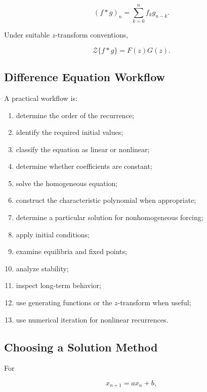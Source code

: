 \[
\boxed{
(f*g)_n
=
\sum_{k=0}^{n}
f_k g_{n-k}.
}
\]

Under suitable \(z\)-transform conventions,

\[
\boxed{
\mathcal{Z}\{f*g\}
=
F(z)G(z).
}
\]

\subsection{Difference Equation Workflow}
\label{subsec:difference-equation-workflow}

A practical workflow is:

\begin{enumerate}
    \item determine the order of the recurrence;
    \item identify the required initial values;
    \item classify the equation as linear or nonlinear;
    \item determine whether coefficients are constant;
    \item solve the homogeneous equation;
    \item construct the characteristic polynomial when appropriate;
    \item determine a particular solution for nonhomogeneous forcing;
    \item apply initial conditions;
    \item examine equilibria and fixed points;
    \item analyze stability;
    \item inspect long-term behavior;
    \item use generating functions or the \(z\)-transform when useful;
    \item use numerical iteration for nonlinear recurrences.
\end{enumerate}

\subsection{Choosing a Solution Method}
\label{subsec:choosing-difference-solution-method}

For

\[
x_{n+1}=ax_n+b,
\]

